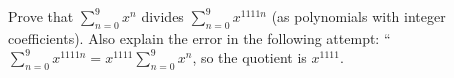 Prove that $\displaystyle\sum_{n=0}^{9}x^n$ divides $\displaystyle\sum_{n=0}^{9}x^{1111n}$ (as polynomials with integer coefficients). Also explain the error in the following attempt: ``$\displaystyle\sum_{n=0}^{9}x^{1111n}=x^{1111}\sum_{n=0}^{9}x^n$, so the quotient is $x^{1111}$.
